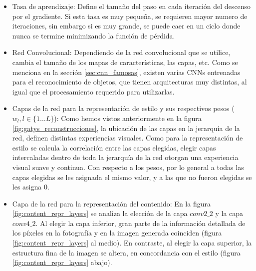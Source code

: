 \documentclass[a4paper,11pt,spanish]{book}
\begin{document}
\begin{itemize}
	 \item Tasa de aprendizaje: Define el tamaño del paso en cada iteración del descenso por el gradiente. Si esta tasa es muy pequeña, se requieren mayor numero 
	  de iteraciones, sin embargo si es muy grande, se puede caer en un ciclo donde nunca se termine minimizando la función de pérdida. 
	 \item Red Convolucional: Dependiendo de la red convolucional que se utilice, cambia el tamaño de los mapas de características, las capas, etc.
	  Como se menciona en la sección \ref{sec:cnn_famosas}, existen varias CNNs entrenadas para el reconocimiento de objetos, que tienen arquitecturas
	  muy distintas, al igual que el procesamiento requerido para utilizarlas.
	 \item Capas de la red para la representación de estilo y sus respectivos pesos ($w_l, l \in \{1 \dots L\}$): Como hemos vistos anteriormente en la figura \ref{fig:gatys_reconstrucciones}, 
	 la ubicación de las capas en la jerarquía de la red, definen distintas experiencias visuales. Como para la representación de estilo se calcula la correlación entre las capas elegidas,
	 elegir capas intercaladas dentro de toda la jerarquía de la red otorgan una experiencia visual suave y continua.
	 Con respecto a los pesos, por lo general a todas las capas elegidas se les asignada el mismo valor, y a las que no fueron elegidas se les asigna 0.
	 \item Capa de la red para la representación del contenido: En la figura \ref{fig:content_repr_layers} se analiza la elección de la capa $conv2\_2$ y la capa $conv4\_2$.
	 Al elegir la capa inferior, gran parte de la información detallada de los píxeles en la fotografía y en la imagen generada coinciden (figura \ref{fig:content_repr_layers} al medio).
	 En contraste, al elegir la capa superior, la estructura fina de la imagen se altera, en concordancia con el estilo (figura \ref{fig:content_repr_layers} abajo).
	 \begin{figure}[h]

\end{figure}
\end{itemize}
\end{document}
